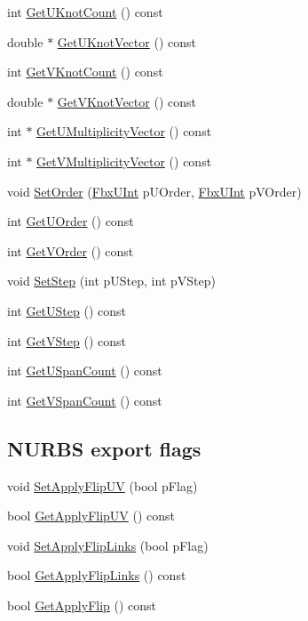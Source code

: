 \begin{DoxyCompactItemize}
\item 
int \hyperlink{class_fbx_nurbs_aea79ac3dfc5c0d5071cb7cc1d97f5a70}{Get\+U\+Knot\+Count} () const
\item 
double $\ast$ \hyperlink{class_fbx_nurbs_a114b6f34a8d2438f3916a6ac7e96af2a}{Get\+U\+Knot\+Vector} () const
\item 
int \hyperlink{class_fbx_nurbs_afd3187f4ef9e1e02b41f14bdb1a4bcbc}{Get\+V\+Knot\+Count} () const
\item 
double $\ast$ \hyperlink{class_fbx_nurbs_ab47ef5f3ec84fa392c38c1d0d3b2ca77}{Get\+V\+Knot\+Vector} () const
\item 
int $\ast$ \hyperlink{class_fbx_nurbs_a0ee516428900821e7d97aa745753d0b4}{Get\+U\+Multiplicity\+Vector} () const
\item 
int $\ast$ \hyperlink{class_fbx_nurbs_a02bdc93c80499e43de757d4772270dac}{Get\+V\+Multiplicity\+Vector} () const
\item 
void \hyperlink{class_fbx_nurbs_a50b478b4c7feab9bf41b805f9893c598}{Set\+Order} (\hyperlink{fbxtypes_8h_ae9fb141d8158a730aa85ec5ff2ea3f6b}{Fbx\+U\+Int} p\+U\+Order, \hyperlink{fbxtypes_8h_ae9fb141d8158a730aa85ec5ff2ea3f6b}{Fbx\+U\+Int} p\+V\+Order)
\item 
int \hyperlink{class_fbx_nurbs_a7312be9277b3ca4bf10a723585bd6663}{Get\+U\+Order} () const
\item 
int \hyperlink{class_fbx_nurbs_a7c7aff46a8e42db3d788f5a4c4d50797}{Get\+V\+Order} () const
\item 
void \hyperlink{class_fbx_nurbs_a4b60585e7190d50e95947ddfcafd39a7}{Set\+Step} (int p\+U\+Step, int p\+V\+Step)
\item 
int \hyperlink{class_fbx_nurbs_a99382e737bd84391f67b00ed6866e1dd}{Get\+U\+Step} () const
\item 
int \hyperlink{class_fbx_nurbs_abd23a5b818a3227b9de8a4aec12d2e1b}{Get\+V\+Step} () const
\item 
int \hyperlink{class_fbx_nurbs_aeac9fe4b1bd0deeb34854a968c852e0e}{Get\+U\+Span\+Count} () const
\item 
int \hyperlink{class_fbx_nurbs_a7e3517eab37efde3ed70789fdfc62dfe}{Get\+V\+Span\+Count} () const
\end{DoxyCompactItemize}
\subsection*{N\+U\+R\+BS export flags}
\begin{DoxyCompactItemize}
\item 
void \hyperlink{class_fbx_nurbs_ab5f463575449cbc5734258f061f3c9ba}{Set\+Apply\+Flip\+UV} (bool p\+Flag)
\item 
bool \hyperlink{class_fbx_nurbs_a1ad0c6471229c9e67da843f0895cb055}{Get\+Apply\+Flip\+UV} () const
\item 
void \hyperlink{class_fbx_nurbs_a9e251f61538745bef6ebd5560f52a61f}{Set\+Apply\+Flip\+Links} (bool p\+Flag)
\item 
bool \hyperlink{class_fbx_nurbs_a7b3adc47808af1078b0d3865cc464b4a}{Get\+Apply\+Flip\+Links} () const
\item 
bool \hyperlink{class_fbx_nurbs_a5078e2c4f27160149e19cac9c0352ceb}{Get\+Apply\+Flip} () const
\end{DoxyCompactItemize}
